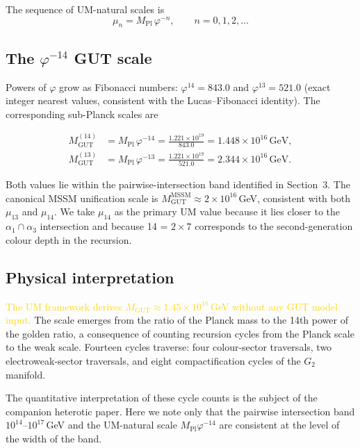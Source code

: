 \documentclass[12pt]{article}
\begin{document}
The sequence of UM-natural scales is
\begin{equation}
  \mu_n = M_{\text{Pl}}\,\varphi^{-n},
  \qquad n = 0, 1, 2, \ldots
  \label{eq:scales}
\end{equation}

\subsection{The $\varphi^{-14}$ GUT scale}

Powers of $\varphi$ grow as Fibonacci numbers: $\varphi^{14} = 843.0$ and
$\varphi^{13} = 521.0$ (exact integer nearest values, consistent with the
Lucas--Fibonacci identity). The corresponding sub-Planck scales are

\begin{align}
  M_{\text{GUT}}^{(14)}
    &= M_{\text{Pl}}\,\varphi^{-14}
     = \frac{1.221 \times 10^{19}}{843.0}
     = 1.448 \times 10^{16}\,\text{GeV},
  \label{eq:mgut14}\\
  M_{\text{GUT}}^{(13)}
    &= M_{\text{Pl}}\,\varphi^{-13}
     = \frac{1.221 \times 10^{19}}{521.0}
     = 2.344 \times 10^{16}\,\text{GeV}.
  \label{eq:mgut13}
\end{align}

Both values lie within the pairwise-intersection band identified in
Section~3. The canonical MSSM unification scale is $M_{\text{GUT}}^{\text{MSSM}}
\approx 2 \times 10^{16}$\,GeV, consistent with both
$\mu_{13}$ and $\mu_{14}$. We take $\mu_{14}$ as the primary UM value
because it lies closer to the $\alpha_1 \cap \alpha_3$ intersection and
because 14 = $2 \times 7$ corresponds to the second-generation colour
depth in the recursion.

\subsection{Physical interpretation}

\textcolor{gold}{The UM framework derives $M_{\text{GUT}} \approx 1.45\times10^{16}$\,GeV
without any GUT model input.} The scale emerges from the ratio of the
Planck mass to the 14th power of the golden ratio, a consequence of counting
recursion cycles from the Planck scale to the weak scale. Fourteen cycles
traverse: four colour-sector traversals, two electroweak-sector traversals,
and eight compactification cycles of the $G_2$ manifold.

The quantitative interpretation of these cycle counts is the subject of the
companion heterotic paper. Here we note only that the pairwise intersection
band $10^{14}$--$10^{17}$\,GeV and the UM-natural scale
$M_{\text{Pl}}\varphi^{-14}$ are consistent at the level of the width of the
band.
\end{document}
